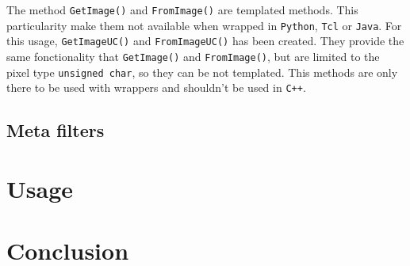 \documentclass{InsightArticle}
\begin{document}
The method \verb$GetImage()$ and \verb$FromImage()$ are templated methods. This particularity
make them not available when wrapped in \verb$Python$, \verb$Tcl$ or \verb$Java$. For this usage,
\verb$GetImageUC()$ and \verb$FromImageUC()$ has been created. They provide the same fonctionality
that \verb$GetImage()$ and \verb$FromImage()$, but are limited to the pixel type \verb$unsigned char$, so
they can be not templated. This methods are only there to be used with wrappers
and shouldn't be used in \verb$C++$.

 \subsection{Meta filters}


\section{Usage}

\section{Conclusion}









\appendix





\nocite{ITKSoftwareGuide}
\end{document}
